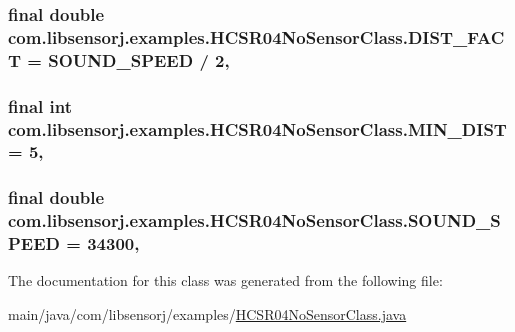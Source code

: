\subsubsection[{D\+I\+S\+T\+\_\+\+F\+A\+C\+T}]{\setlength{\rightskip}{0pt plus 5cm}final double com.\+libsensorj.\+examples.\+H\+C\+S\+R04\+No\+Sensor\+Class.\+D\+I\+S\+T\+\_\+\+F\+A\+C\+T = {\bf S\+O\+U\+N\+D\+\_\+\+S\+P\+E\+E\+D} / 2\hspace{0.3cm}{\ttfamily [static]}, {\ttfamily [private]}}\label{classcom_1_1libsensorj_1_1examples_1_1HCSR04NoSensorClass_a447e78595330f5f3be7717047ede01d0}
\hypertarget{classcom_1_1libsensorj_1_1examples_1_1HCSR04NoSensorClass_a1c873dc1361c25c0c972a4836d8f1169}{}
\subsubsection[{M\+I\+N\+\_\+\+D\+I\+S\+T}]{\setlength{\rightskip}{0pt plus 5cm}final int com.\+libsensorj.\+examples.\+H\+C\+S\+R04\+No\+Sensor\+Class.\+M\+I\+N\+\_\+\+D\+I\+S\+T = 5\hspace{0.3cm}{\ttfamily [static]}, {\ttfamily [private]}}\label{classcom_1_1libsensorj_1_1examples_1_1HCSR04NoSensorClass_a1c873dc1361c25c0c972a4836d8f1169}
\hypertarget{classcom_1_1libsensorj_1_1examples_1_1HCSR04NoSensorClass_aae05bb29da08230984f93f167de14ee6}{}
\subsubsection[{S\+O\+U\+N\+D\+\_\+\+S\+P\+E\+E\+D}]{\setlength{\rightskip}{0pt plus 5cm}final double com.\+libsensorj.\+examples.\+H\+C\+S\+R04\+No\+Sensor\+Class.\+S\+O\+U\+N\+D\+\_\+\+S\+P\+E\+E\+D = 34300\hspace{0.3cm}{\ttfamily [static]}, {\ttfamily [private]}}\label{classcom_1_1libsensorj_1_1examples_1_1HCSR04NoSensorClass_aae05bb29da08230984f93f167de14ee6}


The documentation for this class was generated from the following file\+:\begin{DoxyCompactItemize}
\item 
main/java/com/libsensorj/examples/\hyperlink{HCSR04NoSensorClass_8java}{H\+C\+S\+R04\+No\+Sensor\+Class.\+java}\end{DoxyCompactItemize}
